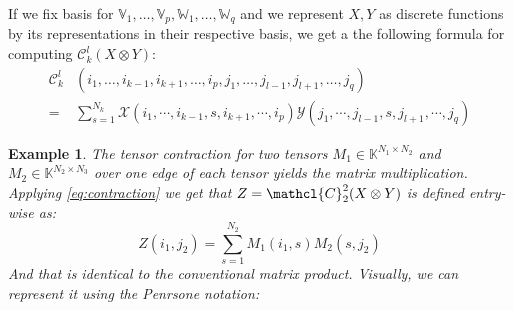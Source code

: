 \documentclass[11pt,a4paper,openright,oneside]{book}
\numberwithin{equation}{section}
\newtheorem{example0}[defn0]{Example}
\newenvironment{example}{ \begin{example0}\rm}{\end{example0}}
\newcommand{\refeq}[1]{\cref{#1}}
\begin{document}
If we fix basis for $\mathbb{V}_1, \dots, \mathbb{V}_p, \mathbb{W}_1, \dots, \mathbb{W}_q$ and we represent $X, Y$
as discrete functions by its representations in their respective basis, we get a the following formula for computing $\mathcal{C}_k^l(X \otimes Y)$:
    \begin{equation}
    \begin{align}\mathcal{C}_k^l & (i_1, \dots, i_{k-1}, i_{k+1}, \dots, i_p, j_1, \dots, j_{l-1}, j_{l+1}, \dots, j_q) \\  =& \sum_{s=1}^{N_k}
        \mathcal{X}(i_1, \cdots, i_{k-1}, s, i_{k+1}, \cdots, i_p) \mathcal{Y}(j_1, \cdots, j_{l-1}, s, j_{l+1}, \cdots, j_q)
\end{align}
\label{eq:contraction}
    \end{equation}

\begin{example}
    The tensor contraction for two tensors $M_1 \in \mathbb{K}^{N_1 \times N_2}$ and $M_2 \in \mathbb{K}^{N_2 \times N_3}$ over one edge of each tensor yields the matrix multiplication.
    Applying \refeq{eq:contraction} we get that $Z = \mathcl{C}_2^2 (X \otimes Y)$ is defined entry-wise as:
    $$Z (i_1, j_2) = \sum_{s=1}^{N_2} M_1(i_1, s) M_2(s, j_2)$$
    And that is identical to the conventional matrix product. Visually, we can represent it using the Penrsone notation:
    \begin{center}
    \hfill
\begin{minipage}{0.2\textwidth}
\end{minipage}
\hfill
\begin{minipage}{0.225\textwidth}
\end{minipage}
\hfill
\begin{minipage}{0.225\textwidth}
\end{minipage}

    \end{center}
\end{example}
\end{document}
